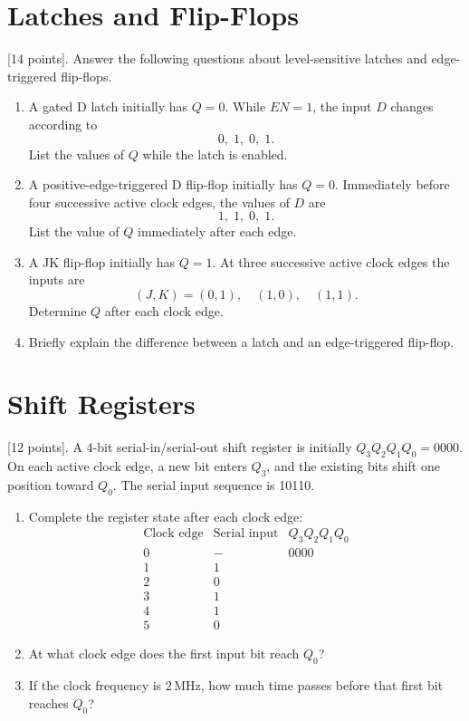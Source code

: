 \documentclass[10pt]{article}
\begin{document}
\section{Latches and Flip-Flops}

[14 points]. Answer the following questions about level-sensitive latches and edge-triggered flip-flops.

\begin{enumerate}
\item A gated D latch initially has $Q=0$. While $EN=1$, the input $D$ changes according to
\[
0,\;1,\;0,\;1.
\]
List the values of $Q$ while the latch is enabled. \\ \vspace{0.5cm}
\item A positive-edge-triggered D flip-flop initially has $Q=0$. Immediately before four successive active clock edges, the values of $D$ are
\[
1,\;1,\;0,\;1.
\]
List the value of $Q$ immediately after each edge. \\ \vspace{0.5cm}
\item A JK flip-flop initially has $Q=1$. At three successive active clock edges the inputs are
\[
(J,K)=(0,1),\quad(1,0),\quad(1,1).
\]
Determine $Q$ after each clock edge. \\ \vspace{1cm}
\item Briefly explain the difference between a latch and an edge-triggered flip-flop. \\ \vspace{1.5cm}
\end{enumerate}

\section{Shift Registers}

[12 points]. A 4-bit serial-in/serial-out shift register is initially $Q_3Q_2Q_1Q_0=0000$.  On each active clock edge, a new bit enters $Q_3$, and the existing bits shift one position toward $Q_0$.  The serial input sequence is 10110.
\begin{enumerate}
\item Complete the register state after each clock edge:
\[
\begin{array}{c|c|c}
\text{Clock edge} & \text{Serial input} & Q_3Q_2Q_1Q_0\\ \hline
0 & - & 0000\\
1 & 1 & \\
2 & 0 & \\
3 & 1 & \\
4 & 1 & \\
5 & 0 &
\end{array}
\]
\item At what clock edge does the first input bit reach $Q_0$? \\ \vspace{0.5cm}
\item If the clock frequency is $2\,\mathrm{MHz}$, how much time passes before that first bit reaches $Q_0$? \\ \vspace{0.5cm}
\end{enumerate}
\end{document}
